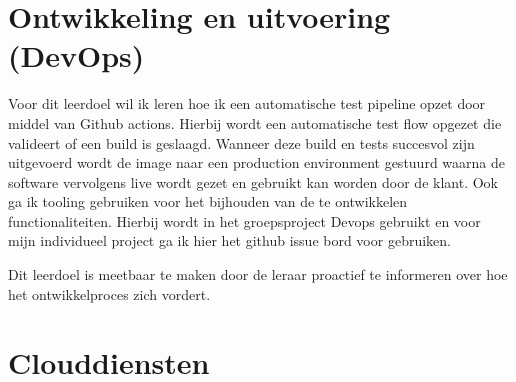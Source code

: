 \section{Ontwikkeling en uitvoering (DevOps)}\label{sec:ontwikkeling-en-uitvoering-(devops)}


Voor dit leerdoel wil ik leren hoe ik een automatische test pipeline opzet door middel van Github actions.
Hierbij wordt een automatische test flow opgezet die valideert of een build is geslaagd.
Wanneer deze build en tests succesvol zijn uitgevoerd wordt de image naar een production environment gestuurd waarna
de software vervolgens live wordt gezet en gebruikt kan worden door de klant.
Ook ga ik tooling gebruiken voor het bijhouden van de te ontwikkelen functionaliteiten. Hierbij wordt in het
groepsproject Devops gebruikt en voor mijn individueel project ga ik hier het github issue bord voor gebruiken.

Dit leerdoel is meetbaar te maken door de leraar proactief te informeren over hoe het ontwikkelproces zich vordert.





\section{Clouddiensten}\label{sec:clouddiensten}

